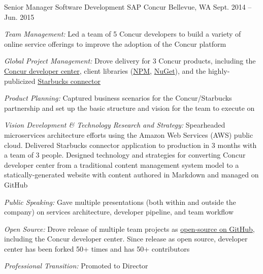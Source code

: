 \begin{cventries}


\cventry
{Senior Manager Software Development}
{SAP Concur}
{Bellevue, WA}
{Sept. 2014 – Jun. 2015}
{ %
\begin{cvitems}
\item {\emph{Team Management:} Led a team of 5 Concur developers to build a variety of online service offerings to improve the adoption of the Concur platform }
\item {\emph{Global Project Management:} Drove delivery for 3 Concur products, including the \href{https://developer.concur.com}{Concur developer center}, client libraries (\href{https://www.npmjs.com/package/concur}{NPM}, \href{https://www.nuget.org/packages/ConcurPlatform/}{NuGet}), and the highly-publicized \href{http://www.bloomberg.com/news/videos/2015-02-23/concur-taking-the-pain-out-of-expense-reports}{Starbucks connector} }
\item {\emph{Product Planning:} Captured business scenarios for the Concur/Starbucks partnership and set up the basic structure and vision for the team to execute on }
\item {\emph{Vision Development \& Technology Research and Strategy:} Spearheaded microservices architecture efforts using the Amazon Web Services (AWS) public cloud. Delivered Starbucks connector application to production in 3 months with a team of 3 people. Designed technology and strategies for converting Concur developer center from a traditional content management system model to a statically-generated website with content authored in Markdown and managed on GitHub }
\item {\emph{Public Speaking:} Gave multiple presentations (both within and outside the company) on services architecture, developer pipeline, and team workflow }
\item {\emph{Open Source:} Drove release of multiple team projects as \href{https://github.com/concur}{open-source on GitHub}, including the Concur developer center. Since release as open source, developer center has been forked 50+ times and has 50+ contributors }
\item {\emph{Professional Transition:} Promoted to Director }
\end{cvitems}
}



\end{cventries}
